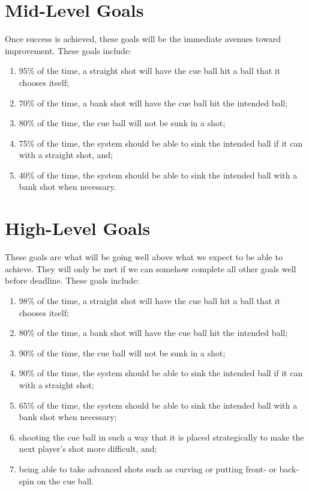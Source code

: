 \documentclass[titlepage]{article}
\begin{document}
\section{Mid-Level Goals}
Once success is achieved, these goals will be the immediate avenues toward improvement. These goals include:
\begin{enumerate}
	\item 95\% of the time, a straight shot will have the cue ball hit a ball that it chooses itself;
	\item 70\% of the time, a bank shot will have the cue ball hit the intended ball;
	\item 80\% of the time, the cue ball will not be sunk in a shot;
	\item 75\% of the time, the system should be able to sink the intended ball if it can with a straight shot, and;
	\item 40\% of the time, the system should be able to sink the intended ball with a bank shot when necessary.
\end{enumerate}

\section{High-Level Goals}
These goals are what will be going well above what we expect to be able to achieve. They will only be met if we can somehow complete all other goals well before deadline. These goals include:
\begin{enumerate}
	\item 98\% of the time, a straight shot will have the cue ball hit a ball that it chooses itself;
	\item 80\% of the time, a bank shot will have the cue ball hit the intended ball;
	\item 90\% of the time, the cue ball will not be sunk in a shot;
	\item 90\% of the time, the system should be able to sink the intended ball if it can with a straight shot;
	\item 65\% of the time, the system should be able to sink the intended ball with a bank shot when necessary;
	\item shooting the cue ball in such a way that it is placed strategically to make the next player's shot more difficult, and;
	\item being able to take advanced shots such as curving or putting front- or back-spin on the cue ball.
\end{enumerate}

\end{document}
